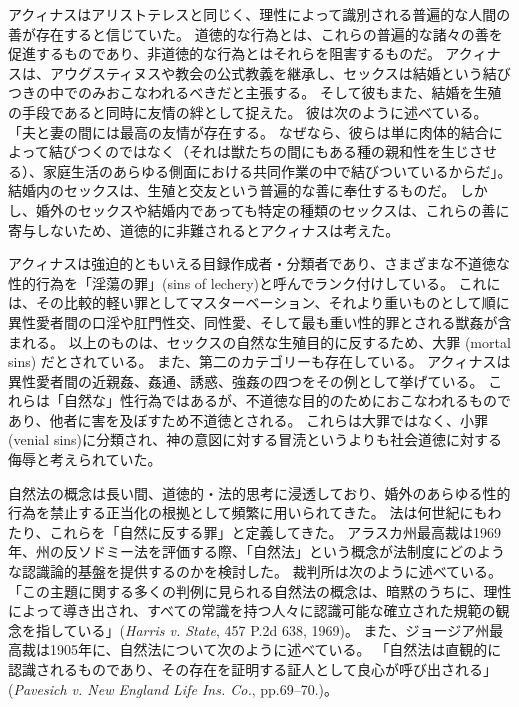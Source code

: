\documentclass[paper=a4,book,openany]{jlreq}
\begin{document}
アクィナスはアリストテレスと同じく、理性によって識別される普遍的な人間の善が存在すると信じていた。
道徳的な行為とは、これらの普遍的な諸々の善を促進するものであり、非道徳的な行為とはそれらを阻害するものだ。
アクィナスは、アウグスティヌスや教会の公式教義を継承し、セックスは結婚という結びつきの中でのみおこなわれるべきだと主張する。
そして彼もまた、結婚を生殖の手段であると同時に友情の絆として捉えた。
彼は次のように述べている。
「夫と妻の間には最高の友情が存在する。
なぜなら、彼らは単に肉体的結合によって結びつくのではなく（それは獣たちの間にもある種の親和性を生じさせる）、家庭生活のあらゆる側面における共同作業の中で結びついているからだ」\citep[Bk.3 Pt. 2 Chap. 123]{aquinas55:_summa_gentil}。
結婚内のセックスは、生殖と交友という普遍的な善に奉仕するものだ。
しかし、婚外のセックスや結婚内であっても特定の種類のセックスは、これらの善に寄与しないため、道徳的に非難されるとアクィナスは考えた。

アクィナスは強迫的ともいえる目録作成者・分類者であり、さまざまな不道徳な性的行為を「淫蕩の罪」(sins of lechery)と呼んでランク付けしている。
これには、その比較的軽い罪としてマスターベーション、それより重いものとして順に異性愛者間の口淫や肛門性交、同性愛、そして最も重い性的罪とされる獣姦が含まれる。
以上のものは、セックスの自然な生殖目的に反するため、大罪 (mortal sins) だとされている。
また、第二のカテゴリーも存在している。
アクィナスは異性愛者間の近親姦、姦通、誘惑、強姦の四つをその例として挙げている。
これらは「自然な」性行為ではあるが、不道徳な目的のためにおこなわれるものであり、他者に害を及ぼすため不道徳とされる。
これらは大罪ではなく、小罪(venial sins)に分類され、神の意図に対する冒涜というよりも社会道徳に対する侮辱と考えられていた\citep[cf.][II.ii, Question 154]{aquinas20:_summa_theol}。

自然法の概念は長い間、道徳的・法的思考に浸透しており、婚外のあらゆる性的行為を禁止する正当化の根拠として頻繁に用いられてきた。
法は何世紀にもわたり、これらを「自然に反する罪」と定義してきた。
アラスカ州最高裁は1969年、州の反ソドミー法を評価する際、「自然法」という概念が法制度にどのような認識論的基盤を提供するのかを検討した。
裁判所は次のように述べている。
「この主題に関する多くの判例に見られる自然法の概念は、暗黙のうちに、理性によって導き出され、すべての常識を持つ人々に認識可能な確立された規範の観念を指している」(\emph{Harris v. State}, 457 P.2d 638, 1969)。
また、ジョージア州最高裁は1905年に、自然法について次のように述べている。
「自然法は直観的に認識されるものであり、その存在を証明する証人として良心が呼び出される」(\emph{Pavesich v. New England Life Ins. Co.}, pp.69--70.)。
\end{document}
